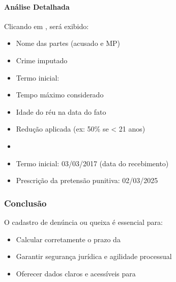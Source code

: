 \documentclass[letterpaper,10pt,brazil]{sphinxmanual}
\begin{document}
\paragraph{Análise Detalhada}
\label{\detokenize{projud_53_cadastrodenuncia:analise-detalhada}}
\sphinxAtStartPar
Clicando em , será exibido:
\begin{itemize}
\item {} 
\sphinxAtStartPar
Nome das partes (acusado e MP)

\item {} 
\sphinxAtStartPar
Crime imputado

\item {} 
\sphinxAtStartPar
Termo inicial: 

\item {} 
\sphinxAtStartPar
Tempo máximo considerado

\item {} 
\sphinxAtStartPar
Idade do réu na data do fato

\item {} 
\sphinxAtStartPar
Redução aplicada (ex: \sphinxhyphen{}50\% se \textless{} 21 anos)

\item {} 
\sphinxAtStartPar
{}

\end{itemize}
\begin{description}
\begin{itemize}
\item {} 
\sphinxAtStartPar
Termo inicial: 03/03/2017 (data do recebimento)

\item {} 
\sphinxAtStartPar
Prescrição da pretensão punitiva: 02/03/2025

\end{itemize}

\end{description}


\subsubsection{Conclusão}
\label{\detokenize{projud_53_cadastrodenuncia:conclusao}}
\sphinxAtStartPar
O cadastro de denúncia ou queixa é essencial para:
\begin{itemize}
\item {} 
\sphinxAtStartPar
Calcular corretamente o prazo da 

\item {} 
\sphinxAtStartPar
Garantir segurança jurídica e agilidade processual

\item {} 
\sphinxAtStartPar
Oferecer dados claros e acessíveis para 

\end{itemize}
\end{document}
